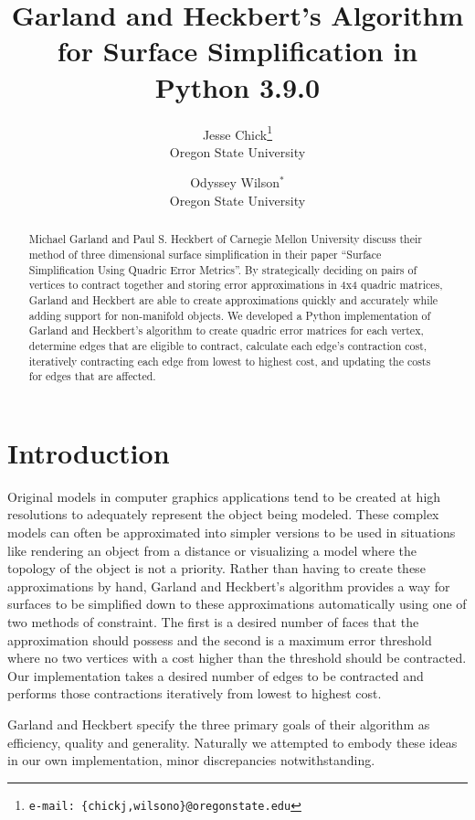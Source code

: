 \documentclass{acmsiggraph}
\title{Garland and Heckbert’s Algorithm for Surface Simplification in Python 3.9.0}
\author{Jesse Chick\thanks{\small\texttt{e-mail: \{chickj,wilsono\}@oregonstate.edu}}\\ Oregon State University
\and Odyssey Wilson$^{\ast}$ \\
Oregon State University}
\begin{document}

\maketitle

\begin{abstract}
Michael Garland and Paul S. Heckbert of Carnegie Mellon University discuss
their method of three dimensional surface simplification in their paper
“Surface Simplification Using Quadric Error Metrics”. By strategically deciding
on pairs of vertices to contract together and storing error approximations in
4x4 quadric matrices, Garland and Heckbert are able to create approximations
quickly and accurately while adding support for non-manifold objects. We 
developed a Python implementation of Garland and Heckbert’s algorithm to create
quadric error matrices for each vertex, determine edges that are eligible to
contract, calculate each edge’s contraction cost, iteratively contracting each
edge from lowest to highest cost, and updating the costs for edges that are
affected.
\end{abstract}


\section{Introduction}
Original models in computer graphics applications tend to be created at high
resolutions to adequately represent the object being modeled. These complex
models can often be approximated into simpler versions to be used in situations
like rendering an object from a distance or visualizing a model where the
topology of the object is not a priority. Rather than having to create these
approximations by hand, Garland and Heckbert’s algorithm provides a way for
surfaces to be simplified down to these approximations automatically using one
of two methods of constraint. The first is a desired number of faces that the
approximation should possess and the second is a maximum error threshold where
no two vertices with a cost higher than the threshold should be contracted. Our
implementation takes a desired number of edges to be contracted and performs
those contractions iteratively from lowest to highest cost.

Garland and Heckbert specify the three primary goals of their algorithm as
efficiency, quality and generality. Naturally we attempted to embody these
ideas in our own implementation, minor discrepancies notwithstanding.
\end{document}
